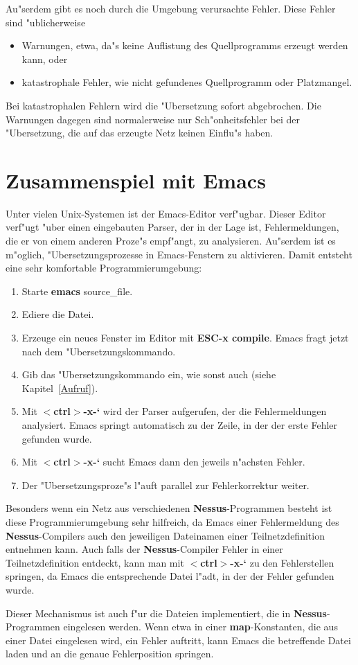 Au"serdem gibt es noch durch die Umgebung verursachte Fehler. Diese
Fehler sind "ublicherweise

\begin{itemize}
  \item Warnungen, etwa, da"s keine Auflistung des Quellprogramms erzeugt werden kann, oder
  \item katastrophale Fehler, wie nicht gefundenes Quellprogramm oder Platzmangel.
\end{itemize} 

Bei katastrophalen Fehlern wird die "Ubersetzung sofort abgebrochen.
Die Warnungen dagegen sind normalerweise nur Sch"onheitsfehler bei der
"Ubersetzung, die auf das erzeugte Netz keinen Einflu"s haben.



\section{Zusammenspiel mit Emacs}

Unter vielen Unix-Systemen ist der Emacs\footnotemark-Editor
verf"ugbar.   Dieser Editor verf"ugt "uber einen eingebauten
Parser, der in der Lage ist, Fehlermeldungen, die er von einem anderen
Proze"s empf"angt, zu analysieren. Au"serdem ist es m"oglich,
"Ubersetzungsprozesse in Emacs-Fenstern zu aktivieren. Damit entsteht
eine sehr komfortable Programmierumgebung:

\begin{enumerate}
  \item Starte {\bf emacs} source\_file.
  \item Ediere die Datei.
  \item Erzeuge ein neues Fenster im Editor mit {\bf ESC-x compile}.
Emacs fragt jetzt nach dem "Ubersetzungskommando. 
  \item Gib das "Ubersetzungskommando ein, wie sonst auch (siehe Kapitel~\ref{Aufruf}).
  \item Mit {\bf $<$ctrl$>$-x-`} wird der Parser aufgerufen, der die
Fehlermeldungen analysiert. Emacs springt 
        automatisch zu der Zeile, in der der erste Fehler gefunden wurde.
  \item Mit {\bf $<$ctrl$>$-x-`} sucht Emacs dann den jeweils n"achsten Fehler.
  \item Der "Ubersetzungsproze"s l"auft parallel zur Fehlerkorrektur weiter.
\end{enumerate}

Besonders wenn ein Netz aus verschiedenen {\bf Nessus}-Programmen
besteht ist diese Programmierumgebung sehr hilfreich, da Emacs einer
Fehlermeldung des {\bf Nessus}-Compilers auch den jeweiligen
Dateinamen einer Teilnetzdefinition entnehmen kann. Auch falls der
{\bf Nessus}-Compiler Fehler in einer Teilnetzdefinition entdeckt,
kann man mit {\bf $<$ctrl$>$-x-`} zu den Fehlerstellen springen, da
Emacs die entsprechende Datei l"adt, in der der Fehler gefunden wurde.

Dieser Mechanismus ist auch f"ur die Dateien implementiert, die in
{\bf Nessus}-Programmen eingelesen werden. Wenn etwa in einer {\bf
map}-Konstanten, die aus einer Datei eingelesen wird, ein Fehler
auftritt, kann Emacs die betreffende Datei laden und an die genaue
Fehlerposition springen.


